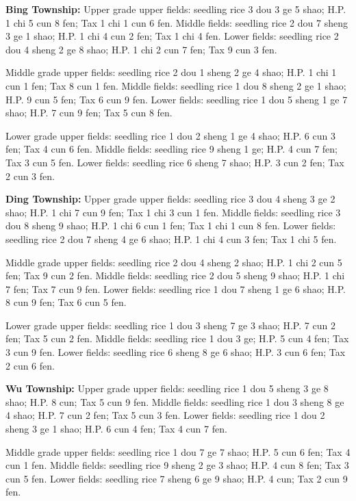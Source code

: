 \documentclass[10pt,a4paper]{article}
\begin{document}
{\textbf{Bing Township:} Upper grade upper fields: seedling rice 3 dou 3 ge 5 shao; H.P. 1 chi 5 cun 8 fen; Tax 1 chi 1 cun 6 fen. Middle fields: seedling rice 2 dou 7 sheng 3 ge 1 shao; H.P. 1 chi 4 cun 2 fen; Tax 1 chi 4 fen. Lower fields: seedling rice 2 dou 4 sheng 2 ge 8 shao; H.P. 1 chi 2 cun 7 fen; Tax 9 cun 3 fen.

Middle grade upper fields: seedling rice 2 dou 1 sheng 2 ge 4 shao; H.P. 1 chi 1 cun 1 fen; Tax 8 cun 1 fen. Middle fields: seedling rice 1 dou 8 sheng 2 ge 1 shao; H.P. 9 cun 5 fen; Tax 6 cun 9 fen. Lower fields: seedling rice 1 dou 5 sheng 1 ge 7 shao; H.P. 7 cun 9 fen; Tax 5 cun 8 fen.

Lower grade upper fields: seedling rice 1 dou 2 sheng 1 ge 4 shao; H.P. 6 cun 3 fen; Tax 4 cun 6 fen. Middle fields: seedling rice 9 sheng 1 ge; H.P. 4 cun 7 fen; Tax 3 cun 5 fen. Lower fields: seedling rice 6 sheng 7 shao; H.P. 3 cun 2 fen; Tax 2 cun 3 fen.

\textbf{Ding Township:} Upper grade upper fields: seedling rice 3 dou 4 sheng 3 ge 2 shao; H.P. 1 chi 7 cun 9 fen; Tax 1 chi 3 cun 1 fen. Middle fields: seedling rice 3 dou 8 sheng 9 shao; H.P. 1 chi 6 cun 1 fen; Tax 1 chi 1 cun 8 fen. Lower fields: seedling rice 2 dou 7 sheng 4 ge 6 shao; H.P. 1 chi 4 cun 3 fen; Tax 1 chi 5 fen.

Middle grade upper fields: seedling rice 2 dou 4 sheng 2 shao; H.P. 1 chi 2 cun 5 fen; Tax 9 cun 2 fen. Middle fields: seedling rice 2 dou 5 sheng 9 shao; H.P. 1 chi 7 fen; Tax 7 cun 9 fen. Lower fields: seedling rice 1 dou 7 sheng 1 ge 6 shao; H.P. 8 cun 9 fen; Tax 6 cun 5 fen.

Lower grade upper fields: seedling rice 1 dou 3 sheng 7 ge 3 shao; H.P. 7 cun 2 fen; Tax 5 cun 2 fen. Middle fields: seedling rice 1 dou 3 ge; H.P. 5 cun 4 fen; Tax 3 cun 9 fen. Lower fields: seedling rice 6 sheng 8 ge 6 shao; H.P. 3 cun 6 fen; Tax 2 cun 6 fen.

\textbf{Wu Township:} Upper grade upper fields: seedling rice 1 dou 5 sheng 3 ge 8 shao; H.P. 8 cun; Tax 5 cun 9 fen. Middle fields: seedling rice 1 dou 3 sheng 8 ge 4 shao; H.P. 7 cun 2 fen; Tax 5 cun 3 fen. Lower fields: seedling rice 1 dou 2 sheng 3 ge 1 shao; H.P. 6 cun 4 fen; Tax 4 cun 7 fen.

Middle grade upper fields: seedling rice 1 dou 7 ge 7 shao; H.P. 5 cun 6 fen; Tax 4 cun 1 fen. Middle fields: seedling rice 9 sheng 2 ge 3 shao; H.P. 4 cun 8 fen; Tax 3 cun 5 fen. Lower fields: seedling rice 7 sheng 6 ge 9 shao; H.P. 4 cun; Tax 2 cun 9 fen.

}
\end{document}

